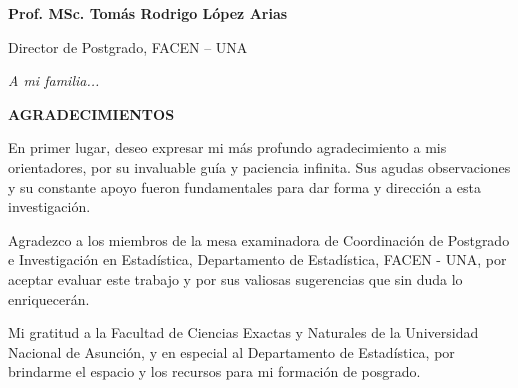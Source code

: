 \documentclass[12pt,a4paper,oneside]{book}
\begin{document}
\begin{center}
    \fontsize{12pt}{15pt}\selectfont
    \textbf{Prof. MSc. Tomás Rodrigo López Arias} \par
    \vspace{-0.25cm}
    Director de Postgrado, FACEN – UNA
\end{center}
\clearpage %

\clearpage
\thispagestyle{fancy} %

\vspace*{11cm} %
\begin{flushright}
    {\fontsize{17pt}{22pt}\selectfont\itshape A mi familia...\par} %
\end{flushright}
\clearpage

\clearpage
\thispagestyle{fancy} %

\begin{center}
    {\fontsize{16pt}{20pt}\selectfont\bfseries AGRADECIMIENTOS\par}
\end{center}
\vspace{1.2cm} %

\begingroup
\setlength{\parindent}{0pt} %
\fontsize{12pt}{16pt}\selectfont %

En primer lugar, deseo expresar mi más profundo agradecimiento a mis orientadores, por su invaluable guía y paciencia infinita. Sus agudas observaciones y su constante apoyo fueron fundamentales para dar forma y dirección a esta investigación.

\vspace{0.4cm} %
Agradezco a los miembros de la mesa examinadora de Coordinación de Postgrado e Investigación en Estadística, Departamento de Estadística, FACEN - UNA, por aceptar evaluar este trabajo y por sus valiosas sugerencias que sin duda lo enriquecerán.

\vspace{0.4cm}
Mi gratitud a la Facultad de Ciencias Exactas y Naturales de la Universidad Nacional de Asunción, y en especial al Departamento de Estadística, por brindarme el espacio y los recursos para mi formación de posgrado.
\end{document}
